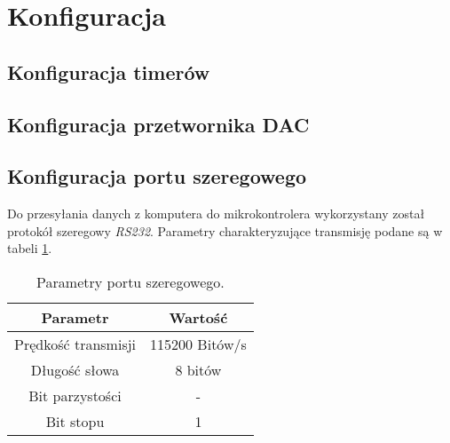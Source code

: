 \section{Konfiguracja}
\subsection{Konfiguracja timerów}

\subsection{Konfiguracja przetwornika DAC}

\subsection{Konfiguracja portu szeregowego}

Do przesyłania danych z komputera do mikrokontrolera wykorzystany został protokół szeregowy \textit{RS232}. Parametry charakteryzujące transmisję podane są w tabeli \ref{tab_rs232}.

\begin{table}[h]
	\caption{Parametry portu szeregowego.}
	\label{tab_rs232}
	\centering
	
	\begin{tabular}{|c|c|}
		\hline
		\textbf{Parametr} & \textbf{Wartość}\\
		\hline
		Prędkość transmisji & 115200 Bitów/s \\
		\hline
		Długość słowa & 8 bitów \\
		\hline
		Bit parzystości & - \\
		\hline
		Bit stopu & 1 \\
		\hline
	\end{tabular}
\end{table}   